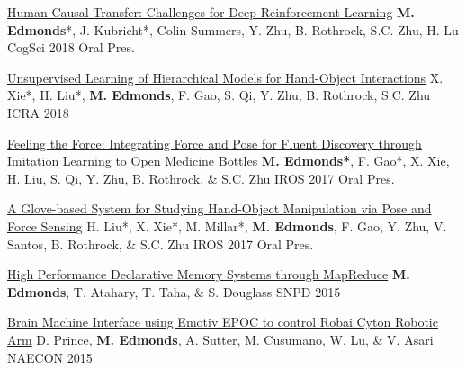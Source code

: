 


\begin{cvpublications}

\item \cvpublication
{\href{http://www.mjedmonds.com/papers/IROS17_OpenBottle_final.pdf}{Human Causal Transfer: Challenges for Deep Reinforcement Learning}} %
{\textbf{M. Edmonds}*, J. Kubricht*, Colin Summers, Y. Zhu, B. Rothrock, S.C. Zhu, H. Lu} %
{CogSci 2018} %
{Oral Pres.} %

\item \cvpublication
{\href{http://www.mjedmonds.com/papers/ICRA18_Unsupervised_learning_hierarchical_hoi.pdf}{Unsupervised Learning of Hierarchical Models for Hand-Object Interactions}} %
{X. Xie*, H. Liu*, \textbf{M. Edmonds}, F. Gao, S. Qi, Y. Zhu, B. Rothrock, S.C. Zhu} %
{ICRA 2018} %
{} %

\item \cvpublication
{\href{http://www.mjedmonds.com/papers/IROS17_OpenBottle_final.pdf}{Feeling the Force: Integrating Force and Pose for Fluent Discovery through Imitation Learning to Open Medicine Bottles}} %
{\textbf{M. Edmonds*}, F. Gao*, X. Xie, H. Liu, S. Qi, Y. Zhu, B. Rothrock, \& S.C. Zhu} %
{IROS 2017} %
{Oral Pres.} %

\item \cvpublication
{\href{http://www.mjedmonds.com/papers/IROS17_GloveHardware_final.pdf}{A Glove-based System for Studying Hand-Object Manipulation via Pose and Force Sensing}} %
{H. Liu*, X. Xie*, M. Millar*, \textbf{M. Edmonds}, F. Gao, Y. Zhu, V. Santos, B. Rothrock, \& S.C. Zhu} %
{IROS 2017} %
{Oral Pres.} %

\item \cvpublication
{\href{http://www.mjedmonds.com/papers/SNPD_2015_HighPerformanceDM_final.pdf}{High Performance Declarative Memory Systems through MapReduce}} %
{\textbf{M. Edmonds}, T. Atahary, T. Taha, \& S. Douglass} %
{SNPD 2015} %
{} %


\item \cvpublication
{\href{http://www.mjedmonds.com/papers/bmi-using-emotiv.pdf}{Brain Machine Interface using Emotiv EPOC to control Robai Cyton Robotic Arm}} %
{D. Prince, \textbf{M. Edmonds}, A. Sutter, M. Cusumano, W. Lu, \& V. Asari} %
{NAECON 2015} %
{} %

\end{cvpublications}
